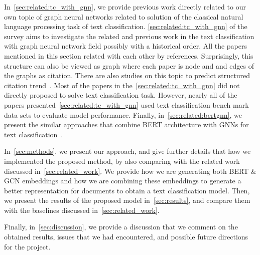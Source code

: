 In~\cref{sec:related:tc_with_gnn}, we provide previous work directly related to our own topic of graph neural networks related to solution of the classical natural language processing task of text classification. \cref{sec:related:tc_with_gnn} of the survey aims to investigate the related and previous work in the text classification with graph neural network field possibly with a historical order. All the papers mentioned in this section related with each other by references. Surprisingly, this structure can also be viewed as graph where each paper is node and and edges of the graphs as citation. There are also studies on this topic to predict structured citation trend~\autocite{citationGNN}. Most of the papers in the~\cref{sec:related:tc_with_gnn} did not directly proposed to solve text classification task. However, nearly all of the papers presented~\cref{sec:related:tc_with_gnn} used text classification bench mark data sets to evaluate model performance. Finally, in~\cref{sec:related:bertgnn}, we present the similar approaches that combine BERT architecture with GNNs for text classification~\autocite{zhibin2020vgcn,yang2021bertenhanced,lin2022bertgcn,she2022bertgcnattention,zeng2022boosting}. 

In~\cref{sec:methods}, we present our approach, and give further details that how we implemented the proposed method, by also comparing with the related work discussed in~\cref{sec:related_work}. We provide how we are generating both BERT \& GCN embeddings and how we are combining these embeddings to generate a better representation for documents to obtain a text classification model. Then, we present the results of the proposed model in~\cref{sec:results}, and compare them with the baselines discussed in~\cref{sec:related_work}.

Finally, in~\cref{sec:discussion}, we provide a discussion that we comment on the obtained results, issues that we had encountered, and possible future directions for the project.

